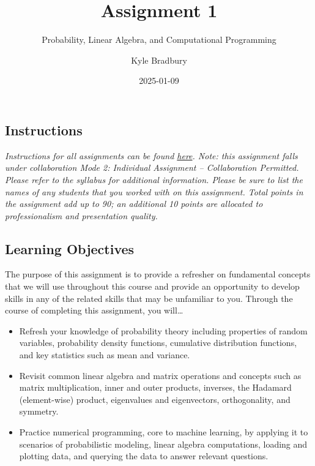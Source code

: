\documentclass[
  letterpaper,
  DIV=11,
  numbers=noendperiod]{scrartcl}
\title{Assignment 1}
\subtitle{Probability, Linear Algebra, and Computational Programming}
\author{Kyle Bradbury}
\date{2025-01-09}
\providecommand{\tightlist}{%
  \setlength{\itemsep}{0pt}\setlength{\parskip}{0pt}}\usepackage{longtable,booktabs,array}
\renewcommand*\contentsname{Table of contents}
\newcommand\contentsname{Table of contents}
\begin{document}
\maketitle

\renewcommand*\contentsname{Table of contents}
{
\hypersetup{linkcolor=}
\setcounter{tocdepth}{1}
\tableofcontents
}

\subsection{Instructions}\label{instructions}

\emph{Instructions for all assignments can be found
\href{https://kylebradbury.github.io/ids705/notebooks/assignment_instructions.html}{here}.
Note: this assignment falls under collaboration Mode 2: Individual
Assignment -- Collaboration Permitted. Please refer to the syllabus for
additional information. Please be sure to list the names of any students
that you worked with on this assignment. Total points in the assignment
add up to 90; an additional 10 points are allocated to professionalism
and presentation quality.}

\subsection{Learning Objectives}\label{learning-objectives}

The purpose of this assignment is to provide a refresher on fundamental
concepts that we will use throughout this course and provide an
opportunity to develop skills in any of the related skills that may be
unfamiliar to you. Through the course of completing this assignment, you
will\ldots{}

\begin{itemize}
\tightlist
\item
  Refresh your knowledge of probability theory including properties of
  random variables, probability density functions, cumulative
  distribution functions, and key statistics such as mean and variance.
\item
  Revisit common linear algebra and matrix operations and concepts such
  as matrix multiplication, inner and outer products, inverses, the
  Hadamard (element-wise) product, eigenvalues and eigenvectors,
  orthogonality, and symmetry.
\item
  Practice numerical programming, core to machine learning, by applying
  it to scenarios of probabilistic modeling, linear algebra
  computations, loading and plotting data, and querying the data to
  answer relevant questions.
\end{itemize}
\end{document}
